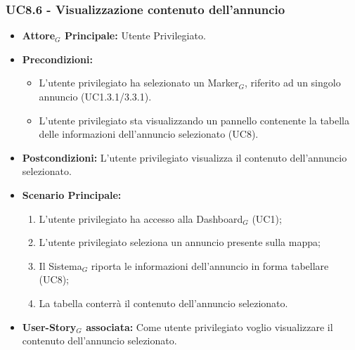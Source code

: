 \documentclass[10pt]{article}
\begin{document}
\begin{justify}
 \subsubsection{\textbf{UC8.6 - Visualizzazione contenuto dell'annuncio}}
 \begin{itemize}
     \item \textbf{Attore$_G$ Principale:} Utente Privilegiato.
     \item \textbf{Precondizioni:}
       \begin{itemize}
    	        \item L'utente privilegiato ha selezionato un Marker$_G$, riferito ad un singolo annuncio (UC1.3.1/3.3.1).
          \item L'utente privilegiato sta visualizzando un pannello contenente la tabella delle informazioni dell'annuncio selezionato (UC8).
       \end{itemize}
     \item \textbf{Postcondizioni:} L'utente privilegiato visualizza il contenuto dell'annuncio selezionato.
     \item \textbf{Scenario Principale:}
        \begin{enumerate}
            \item L'utente privilegiato ha accesso alla Dashboard$_G$ (UC1);
            \item L'utente privilegiato seleziona un annuncio presente sulla mappa;
            \item Il Sistema$_G$ riporta le informazioni dell'annuncio in forma tabellare (UC8);
            \item La tabella conterrà il contenuto dell'annuncio selezionato.
        \end{enumerate}
     \item \textbf{User-Story$_G$ associata:} Come utente privilegiato voglio visualizzare il contenuto dell'annuncio selezionato. 
 \end{itemize}

\end{justify}
\end{document}

